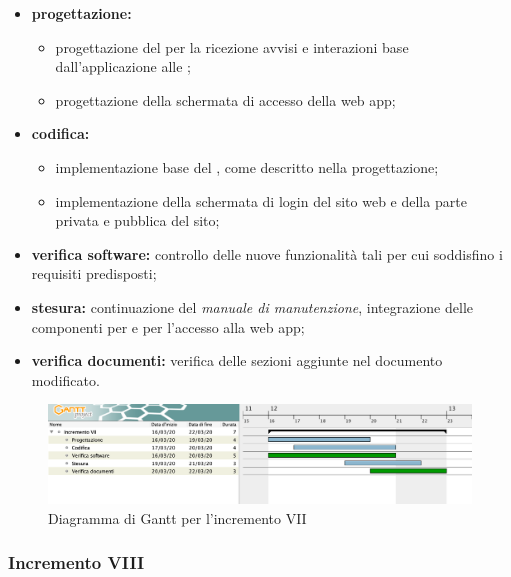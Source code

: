 					\begin{itemize}
						\item \textbf{progettazione:} 
						\begin{itemize}
							\item progettazione del  per la ricezione avvisi e interazioni base dall'applicazione alle ; 
							\item progettazione della schermata di accesso della web app;
						\end{itemize}
						\item \textbf{codifica:} 
						\begin{itemize}
							\item implementazione base del , come descritto nella progettazione; 
							\item implementazione della schermata di login del sito web e della parte privata e pubblica del sito;
						\end{itemize}
						\item \textbf{verifica software:} controllo delle nuove funzionalità tali per cui soddisfino i requisiti predisposti;
						\item \textbf{stesura:} continuazione del \textit{manuale di manutenzione}, integrazione delle componenti per  e per l'accesso alla web app;
						\item \textbf{verifica documenti:} verifica delle sezioni aggiunte nel documento modificato.
					\end{itemize} 			

		\begin{landscape}
          \begin{figure}[H]
            \centering
            \includegraphics[width=\linewidth]{images/gantt/incrementoVII} %
            \caption{Diagramma di Gantt per l'incremento VII}
          \end{figure}		
		\end{landscape}


		\subsubsection{Incremento VIII}
			
